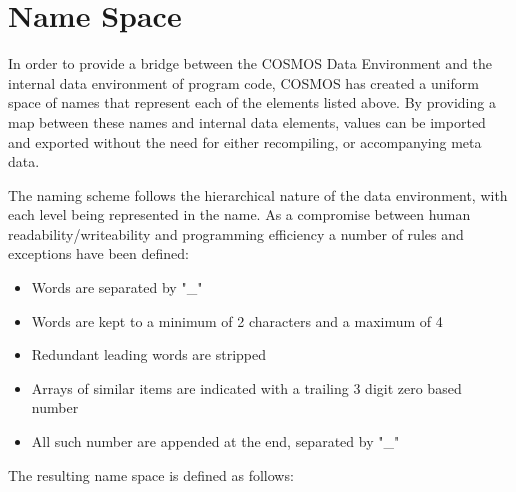 \documentclass[10pt,letterpaper]{report}
\begin{document}
\chapter{Name Space}
In order to provide a bridge between the COSMOS Data Environment and the internal data environment of program code, COSMOS has created a uniform space of names that represent each of the elements listed above. By providing a map between these names and internal data elements, values can be imported and exported without the need for either recompiling, or accompanying meta data.

The naming scheme follows the hierarchical nature of the data environment, with each level being represented in the name. As a compromise between human readability/writeability and programming efficiency a number of rules and exceptions have been defined:
\begin{itemize}
\item Words are separated by "\_"
\item Words are kept to a minimum of 2 characters and a maximum of 4
\item Redundant leading words are stripped
\item Arrays of similar items are indicated with a trailing 3 digit zero based number
\item All such number are appended at the end, separated by "\_"
\end{itemize}
The resulting name space is defined as follows:
\end{document}
